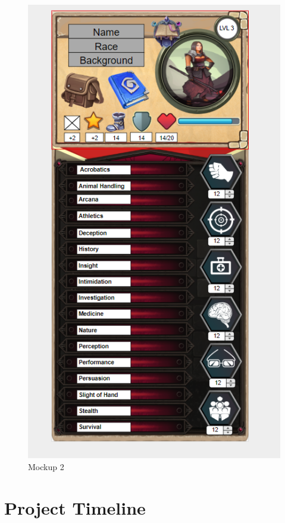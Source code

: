 \documentclass[10pt,conference,onecolumn,compsoc]{IEEEtran}
\begin{document}
\begin{figure}[H]
\begin{minipage}[t]{4cm}
		\includegraphics[scale=0.4]{Mobile.png}
		\caption{Mockup 2}
	\end{minipage}
\end{figure}


\section{Project Timeline}
\end{document}
